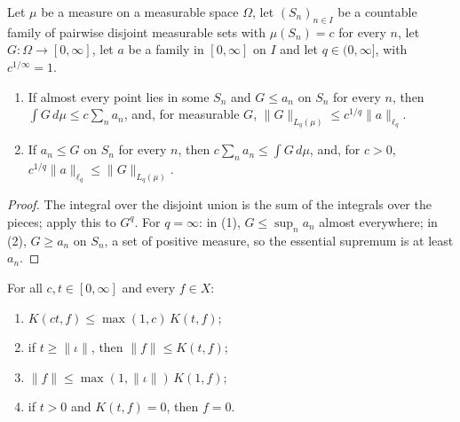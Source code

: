 \begin{lemma}
\label{lem:bounded-on-pieces}
\leanok
{}
Let $\mu$ be a measure on a measurable space $\Omega$, let $(S_n)_{n \in I}$ be a countable family
of pairwise disjoint measurable sets with $\mu(S_n) = c$ for every $n$, let
$G : \Omega \to [0, \infty]$, let $a$ be a family in $[0, \infty]$ on $I$ and let
$q \in (0, \infty]$, with $c^{1/\infty} = 1$.
\begin{enumerate}
  \item If almost every point lies in some $S_n$ and $G \leq a_n$ on $S_n$ for every $n$, then
    $\int G \, d\mu \leq c \sum_n a_n$, and, for measurable $G$,
    $\|G\|_{L_q(\mu)} \leq c^{1/q} \|a\|_{\ell_q}$.
  \item If $a_n \leq G$ on $S_n$ for every $n$, then $c \sum_n a_n \leq \int G \, d\mu$, and, for
    $c > 0$, $c^{1/q} \|a\|_{\ell_q} \leq \|G\|_{L_q(\mu)}$.
\end{enumerate}
\end{lemma}

\begin{proof}
\leanok
The integral over the disjoint union is the sum of the integrals over the pieces; apply this to
$G^q$. For $q = \infty$: in (1), $G \leq \sup_n a_n$ almost everywhere; in (2), $G \geq a_n$ on
$S_n$, a set of positive measure, so the essential supremum is at least $a_n$.
\end{proof}

\begin{lemma}
\label{lem:k-functional-scales}
\leanok
{}
For all $c, t \in [0, \infty]$ and every $f \in X$:
\begin{enumerate}
  \item $K(ct, f) \leq \max(1, c) \, K(t, f)$;
  \item if $t \geq \|\iota\|$, then $\|f\| \leq K(t, f)$;
  \item $\|f\| \leq \max(1, \|\iota\|) \, K(1, f)$;
  \item if $t > 0$ and $K(t, f) = 0$, then $f = 0$.
\end{enumerate}
\end{lemma}

